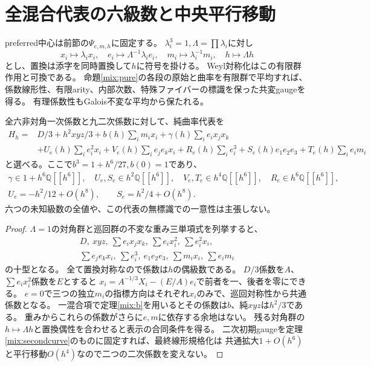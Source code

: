 \section{全混合代表の六級数と中央平行移動}
preferred中心は前節の$\Psi_{e,m,h}$に固定する。
$\lambda_i^3=1,\Lambda=\prod\lambda_i$に対し
\[
 x_i\mapsto\lambda_i x_i,\quad e_i\mapsto\Lambda^{-1}\lambda_i e_i,\quad
 m_i\mapsto\lambda_i^{-1}m_i,\quad h\mapsto\Lambda h
\]
とし、置換は添字を同時置換して$h$に符号を掛ける。
Weyl対称化はこの有限群作用と可換である。
命題\ref{mix:pure}の各段の原始と曲率を有限群で平均すれば、
係数線形性、有限arity、内部次数、特殊ファイバーの標識を保った共変gaugeを得る。
有理係数性もGalois不変な平均から保たれる。

\begin{theorem}\label{mix:six}
全六非対角一次係数と九二次係数に対して、純曲率代表を
\begin{align*}
 H_h={}&D/3+h^2xyz/3+b(h)\sum_i m_ix_i+\gamma(h)\sum_i e_ix_jx_k\\
 &+U_e(h)\sum_i e_i^2x_i+V_e(h)\sum_i e_je_kx_i
   +R_e(h)\sum_i e_i^3+S_e(h)e_1e_2e_3+T_e(h)\sum_i e_im_i
\end{align*}
と選べる。ここで$b^3=1+h^6/27,b(0)=1$であり、
\begin{gather*}
 \gamma\in1+h^6\mathbb Q[[h^6]],\quad
 U_e,S_e\in h^2\mathbb Q[[h^6]],\quad
 V_e,T_e\in h^4\mathbb Q[[h^6]],\quad R_e\in h^6\mathbb Q[[h^6]],\\
 U_e=-h^2/12+O(h^8),\qquad S_e=h^2/4+O(h^8).
\end{gather*}
六つの未知級数の全値や、この代表の無標識での一意性は主張しない。
\end{theorem}
\begin{proof}
$\Lambda=1$の対角群と巡回群の不変な重み三単項式を列挙すると、
\begin{gather*}
 D,\ xyz,\ \sum e_ix_jx_k,\ \sum e_ix_i^2,\ \sum e_i^2x_i,\\
 \sum e_je_kx_i,\ \sum e_i^3,\ e_1e_2e_3,\ \sum m_ix_i,\ \sum e_im_i
\end{gather*}
の十型となる。
全て置換対称なので係数は$h$の偶級数である。
$D/3$係数を$A$、$\sum e_ix_i^2$係数を$E$とすると
$x_i=A^{-1/3}X_i-(E/A)e_i$で前者を一、後者を零にできる。
$e=0$で三つの独立$m_i$の指標方向はそれぞれ$x_i$のみで、巡回対称性から共通係数となる。
一混合項で定理\ref{mix:b}を用いるとその係数は$b$、純$xyz$は$h^2/3$である。
重みからこれらの係数がさらに$e,m$に依存する余地はない。
残る対角群の$h\mapsto\Lambda h$と置換偶性を合わせると表示の合同条件を得る。
二次初期gaugeを定理\ref{mix:secondcurve}のものに固定すれば、最終線形規格化は
共通拡大$1+O(h^6)$と平行移動$O(h^4)$なので二つの二次係数を変えない。
\end{proof}

